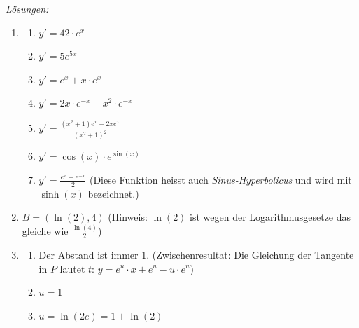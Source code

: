 \clearpage
\emph{Lösungen:}
\begin{enumerate}
	\item
	      \begin{enumerate}
		      \item $y'= 42\cdot e^x$
		      \item $y'= 5e^{5x}$
		      \item $y'= e^x + x\cdot e^x$
		      \item $y'= 2x\cdot e^{-x} - x^2 \cdot e^{-x}$
		      \item $y' = \frac{(x^2+1)e^x-2xe^x}{(x^2+1)^2}$
		      \item $y' = \cos(x) \cdot e^{\sin(x)}$
		      \item $y' = \frac{e^x-e^{-x}}{2}$ (Diese Funktion heisst auch \emph{Sinus-Hyperbolicus} und wird mit $\sinh(x)$ bezeichnet.)
	      \end{enumerate}
	\item $B=(\ln(2), 4)$ (Hinweis: $\ln(2)$ ist wegen der Logarithmusgesetze das gleiche wie $\frac{\ln(4)}{2}$)

	\item
	      \begin{enumerate}
		      \item Der Abstand ist immer $1$. (Zwischenresultat: Die Gleichung der Tangente in $P$ lautet $t: \, y = e^u \cdot x + e^u - u\cdot e^u$)
		      \item $u=1$
		      \item $u = \ln(2e) = 1+\ln(2)$
	      \end{enumerate}
\end{enumerate}


































\pagebreak

